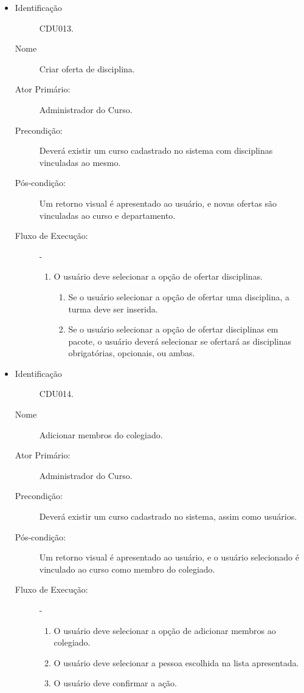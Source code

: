 \begin{itemize}
    \item 
        \begin{description}
           \item[Identificação] CDU013.
           \item[Nome] Criar oferta de disciplina.
           \item[Ator Primário:] Administrador do Curso.
           \item[Precondição:] Deverá existir um curso cadastrado no sistema com disciplinas vinculadas ao mesmo. 
           \item[Pós-condição:] Um retorno visual é apresentado ao usuário, e novas ofertas são vinculadas ao curso e departamento.
           \item[Fluxo de Execução:] -
                \begin{enumerate}
                    \item O usuário deve selecionar a opção de ofertar disciplinas.
                    \begin{enumerate}
                    \item Se o usuário selecionar a opção de ofertar uma disciplina, a turma deve ser inserida.
                    \item Se o usuário selecionar a opção de ofertar disciplinas em pacote, o usuário deverá selecionar se ofertará as disciplinas obrigatórias, opcionais, ou ambas.
                \end{enumerate}
                \end{enumerate}
        \end{description} 
    \vspace{10pt}

    \item 
        \begin{description}
           \item[Identificação] CDU014.
           \item[Nome] Adicionar membros do colegiado.
           \item[Ator Primário:] Administrador do Curso.
           \item[Precondição:] Deverá existir um curso cadastrado no sistema, assim como usuários.
           \item[Pós-condição:] Um retorno visual é apresentado ao usuário, e o usuário selecionado é vinculado ao curso como membro do colegiado.
           \item[Fluxo de Execução:] -
                \begin{enumerate}
                    \item O usuário deve selecionar a opção de adicionar membros ao colegiado.
                    \item O usuário deve selecionar a pessoa escolhida na lista apresentada.
                    \item O usuário deve confirmar a ação.
                \end{enumerate}
        \end{description} 
    \vspace{10pt}



\end{itemize}
